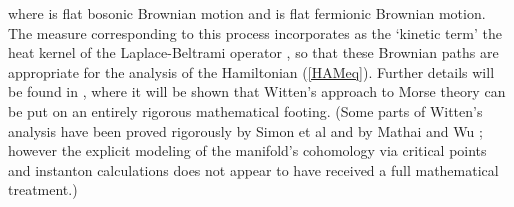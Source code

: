 \documentclass[a4paper,fleqn,12pt]{article}
\begin{document}
where \coordHE{} is flat bosonic Brownian motion and \coordHE{}
is flat fermionic Brownian motion. The measure corresponding
to this process incorporates as the `kinetic term' the heat kernel
of the Laplace-Beltrami operator \coordHE{}, so that these
Brownian paths are appropriate for the analysis of the Hamiltonian
(\ref{HAMeq}). Further details will be found in \cite{TOPP}, where
it will be shown that Witten's approach to Morse theory
\cite{Witten82} can be put on an entirely rigorous mathematical
footing. (Some parts of Witten's analysis have been proved
rigorously by Simon et al \cite{Simetal} and by Mathai and Wu
\cite{MatWu}; however the explicit modeling of the manifold's
cohomology via critical points and instanton calculations does not
appear to have received a full mathematical treatment.)
%
\end{document}
